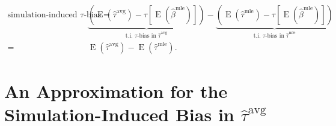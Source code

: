 \documentclass[11pt]{article}
\DeclareMathOperator*{\E}{\text{E}}
\begin{document}
\begin{align*}
\text{simulation-induced } \tau\text{-bias} =& \underbrace{ \left( \E \left( \hat{\tau}^\text{avg}\right) - \tau \left[\E \left( \hat{\beta}^\text{mle} \right) \right] \right) }_{\text{t.i. } \tau\text{-bias in }\hat{\tau}^{\text{avg}}} - \underbrace{ \left( \E \left( \hat{\tau}^\text{mle}\right) -  \tau \left[\E \left( \hat{\beta}^\text{mle} \right) \right] \right) }_{\text{t.i. } \tau\text{-bias in }\hat{\tau}^{\text{mle}}} \\
 =& \E \left( \hat{\tau}^\text{avg}\right) - \E \left( \hat{\tau}^\text{mle}\right) .
\end{align*}


\section*{An Approximation for the Simulation-Induced Bias in $\hat{\tau}^\text{avg}$}
\end{document}
